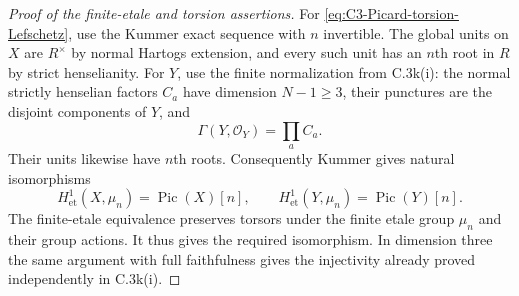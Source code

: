 \begin{proof}[Proof of the finite-etale and torsion assertions]
For \eqref{eq:C3-Picard-torsion-Lefschetz}, use
the Kummer exact sequence with $n$ invertible.
The global units on $X$ are $R^\times$ by
normal Hartogs extension, and every such unit
has an $n$th root in $R$ by strict henselianity.
For $Y$, use the finite normalization from
C.3k(i): the normal strictly henselian factors
$C_a$ have dimension $N-1\ge3$, their punctures
are the disjoint components of $Y$, and
\[
                 \Gamma(Y,\mathcal O_Y)=\prod_a C_a.
\]
Their units likewise have $n$th roots.
Consequently Kummer gives natural isomorphisms
\[
 H^1_{\mathrm{et}}(X,\mu_n)=\operatorname{Pic}(X)[n],
 \qquad
 H^1_{\mathrm{et}}(Y,\mu_n)=\operatorname{Pic}(Y)[n].
\]
The finite-etale equivalence preserves torsors
under the finite etale group $\mu_n$ and their
group actions. It thus gives the required
isomorphism. In dimension three the same
argument with full faithfulness gives the
injectivity already proved independently in
C.3k(i).
\end{proof}

